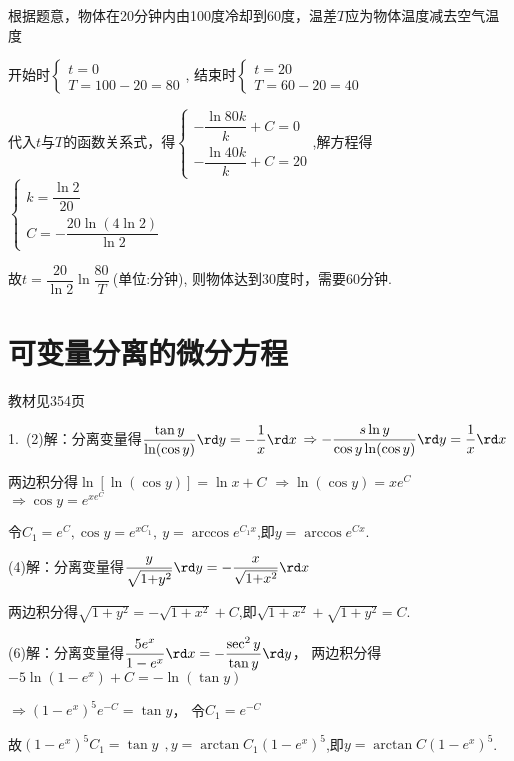   根据题意，物体在20分钟内由100度冷却到60度，温差$T$应为物体温度减去空气温度

  开始时$\begin{cases}t=0\\T=100-20=80\end{cases}$, 结束时$\begin{cases}t=20\\T=60-20=40\end{cases}$

  代入$t$与$T$的函数关系式，得$\begin{cases}-\dfrac{ \ln 80k}{k}+C=0\\-\dfrac{ \ln 40k}{k}+C=20\end{cases}$,解方程得$\begin{cases}k=\dfrac{ \ln 2}{20}\\C=-\dfrac{20 \ln (4 \ln 2)}{ \ln 2}\end{cases}$

  故$t=\dfrac{20}{ \ln 2} \ln \dfrac{80}{T}~$(单位:分钟), 则物体达到30度时，需要60分钟.


\section{可变量分离的微分方程}
\begin{flushright}
  \color{zhanqing!80}
   教材见354页
\end{flushright}
  1.~(2)解：分离变量得$\dfrac{ \tan y }{ \ln ( \cos y )}\rd y = -\dfrac{1}{x}\rd x$
  $\Rightarrow -\dfrac{s \ln y}{ \cos y  \ln ( \cos y )}\rd y =\dfrac{1}{x}\rd x$

  两边积分得$\ln [ \ln ( \cos y )] = \ln x+C$
  $\Rightarrow \ln ( \cos y ) =xe^C$
  $\Rightarrow \cos y =e^{xe^C}$

  令$C_1=e^C, \cos y =e^{xC_1},~y=\arccos e^{C_1x}$,即$y=\arccos e^{Cx}$.

  (4)解：分离变量得$\dfrac{y}{\sqrt {1{ + }y^2} }\rd y=-\dfrac{x}{\sqrt {1{ + }x^2} }\rd x$

  两边积分得$\sqrt {1{ + }y^2} =-\sqrt {1{ + }x^2} +C$,即$\sqrt {1{ + }x^2} +\sqrt {1{ + }y^2} =C$.

  (6)解：分离变量得$\dfrac{5e^x}{1-e^x}\rd x=-\dfrac{\sec^2y}{ \tan y }\rd y$，
  两边积分得$-5 \ln (1-e^x)+C = - \ln ( \tan y )$

  $\Rightarrow (1-e^x)^5e^{-C} = \tan y$，
  令$C_1=e^{-C}$

  故$(1-e^x)^5C_1= \tan y ~~,y=\arctan C_1(1-e^x)^5$,即$y=\arctan C(1-e^x)^5$.

